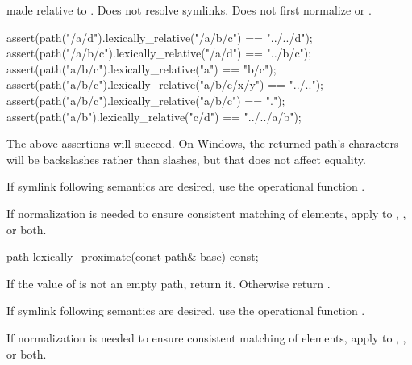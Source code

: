 \begin{itemdescr}
\pnum
\returns
{} made relative to .
Does not resolve symlinks.
Does not first normalize  or .

\pnum
\begin{example}
\begin{codeblock}
assert(path("/a/d").lexically_relative("/a/b/c") == "../../d");
assert(path("/a/b/c").lexically_relative("/a/d") == "../b/c");
assert(path("a/b/c").lexically_relative("a") == "b/c");
assert(path("a/b/c").lexically_relative("a/b/c/x/y") == "../..");
assert(path("a/b/c").lexically_relative("a/b/c") == ".");
assert(path("a/b").lexically_relative("c/d") == "../../a/b");
\end{codeblock}
The above assertions will succeed.
On Windows, the returned path's  characters
will be backslashes rather than slashes,
but that does not affect  equality.
\end{example}

\pnum
\begin{note}
If symlink following semantics are desired,
  use the operational function .
\end{note}

\pnum
\begin{note}
If normalization is needed
  to ensure consistent matching of elements,
  apply  to
  , , or both.
\end{note}
\end{itemdescr}

%
\begin{itemdecl}
path lexically_proximate(const path& base) const;
\end{itemdecl}

\begin{itemdescr}
\pnum
\returns
If the value of  is not an empty path,
  return it. Otherwise return .

\pnum
\begin{note}
If symlink following semantics are desired,
  use the operational function .
\end{note}

\pnum
\begin{note}
If normalization is needed
  to ensure consistent matching of elements,
  apply  to
  , , or both.
\end{note}
\end{itemdescr}

